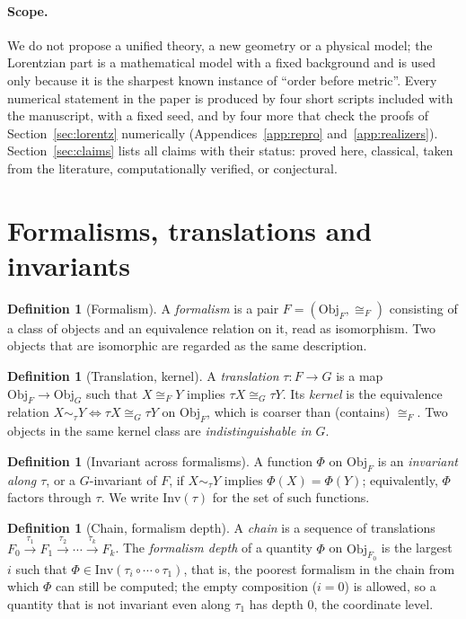 \documentclass[11pt,a4paper]{article}
\theoremstyle{plain}
\theoremstyle{definition}
\newtheorem{definition}[theorem]{Definition}
\theoremstyle{remark}
\newcommand{\Obj}{\mathrm{Obj}}
\newcommand{\Inv}{\mathrm{Inv}}
\begin{document}
\paragraph{Scope.} We do not propose a unified theory, a new geometry or a physical model; the Lorentzian part is a mathematical model with a fixed background and is used only because it is the sharpest known instance of ``order before metric''. Every numerical statement in the paper is produced by four short scripts included with the manuscript, with a fixed seed, and by four more that check the proofs of Section~\ref{sec:lorentz} numerically (Appendices~\ref{app:repro} and~\ref{app:realizers}). Section~\ref{sec:claims} lists all claims with their status: proved here, classical, taken from the literature, computationally verified, or conjectural.

\section{Formalisms, translations and invariants}\label{sec:language}

\begin{definition}[Formalism]
A \emph{formalism} is a pair $F=(\Obj_F,\cong_F)$ consisting of a class of objects and an equivalence relation on it, read as isomorphism. Two objects that are isomorphic are regarded as the same description.
\end{definition}

\begin{definition}[Translation, kernel]
A \emph{translation} $\tau\colon F\to G$ is a map $\Obj_F\to\Obj_G$ such that $X\cong_F Y$ implies $\tau X\cong_G \tau Y$. Its \emph{kernel} is the equivalence relation $X\sim_\tau Y \iff \tau X\cong_G \tau Y$ on $\Obj_F$, which is coarser than (contains) $\cong_F$. Two objects in the same kernel class are \emph{indistinguishable in $G$}.
\end{definition}

\begin{definition}[Invariant across formalisms]
A function $\Phi$ on $\Obj_F$ is an \emph{invariant along $\tau$}, or a $G$-invariant of $F$, if $X\sim_\tau Y$ implies $\Phi(X)=\Phi(Y)$; equivalently, $\Phi$ factors through $\tau$. We write $\Inv(\tau)$ for the set of such functions.
\end{definition}

\begin{definition}[Chain, formalism depth]\label{def:chain}
A \emph{chain} is a sequence of translations $F_0\xrightarrow{\tau_1}F_1\xrightarrow{\tau_2}\cdots\xrightarrow{\tau_k}F_k$. The \emph{formalism depth} of a quantity $\Phi$ on $\Obj_{F_0}$ is the largest $i$ such that $\Phi\in\Inv(\tau_i\circ\cdots\circ\tau_1)$, that is, the poorest formalism in the chain from which $\Phi$ can still be computed; the empty composition ($i=0$) is allowed, so a quantity that is not invariant even along $\tau_1$ has depth $0$, the coordinate level.
\end{definition}
\end{document}
